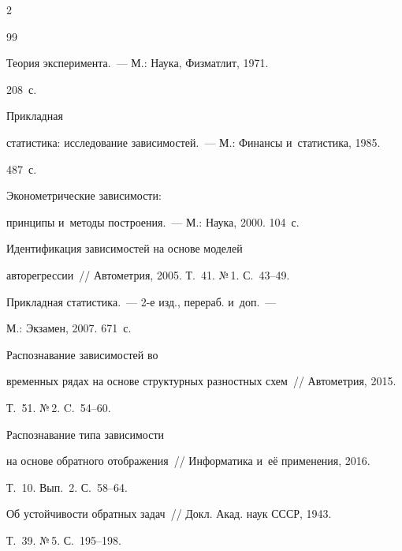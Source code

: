 \begin{multicols}{2}
{{\begin{thebibliography}{99}
   

   


     Теория эксперимента.~--- М.: Наука, Физматлит, 1971. 

208~с.


     Прикладная 

статистика: исследование зависимостей.~--- М.: Финансы и~статистика, 1985. 

487~с.


     Эконометрические зависимости: 

принципы и~методы построения.~--- М.: Наука, 2000. 104~с.


     Идентификация зависимостей на основе моделей 

авторегрессии~// Автометрия, 2005. Т.~41. №\,1. С.~43--49.


     Прикладная статистика.~--- 2-е изд., перераб. и~доп.~--- 

М.: Экзамен, 2007. 671~с.




     Распознавание зависимостей во 

временных рядах на основе структурных разностных схем~// Автометрия, 2015. 

Т.~51. №\,2. C.~54--60.




     Распознавание типа зависимости 

на основе обратного отображения~// Информатика и~её применения, 2016. 

Т.~10. Вып.~2. С.~58--64.

   

    


     Об устойчивости обратных задач~// Докл. Акад. наук СССР, 1943. 

Т.~39. №\,5. С.~195--198.


\end{thebibliography}}}
\end{multicols}
